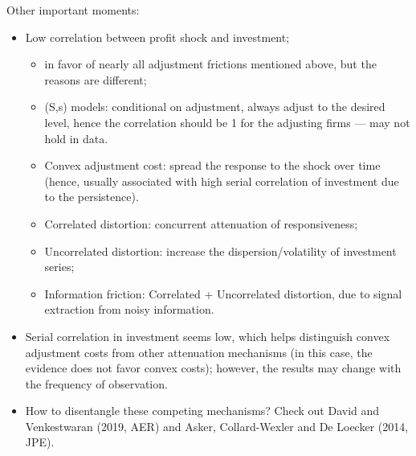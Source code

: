 \documentclass[12pt]{article}
\begin{document}
Other important moments:
\begin{itemize}
	\item Low correlation between profit shock and investment;
	\begin{itemize}
		\item in favor of nearly all adjustment frictions mentioned above, but the reasons are different;
		\item (S,s) models: conditional on adjustment, always adjust to the desired level, hence the correlation should be 1 for the adjusting firms --- may not hold in data.
		\item Convex adjustment cost: spread the response to the shock over time (hence, usually associated with high serial correlation of investment due to the persistence).
		\item Correlated distortion: concurrent attenuation of responsiveness;
		\item Uncorrelated distortion: increase the dispersion/volatility of investment series;
		\item Information friction: Correlated + Uncorrelated distortion, due to signal extraction from noisy information.
	\end{itemize}
		\item Serial correlation in investment seems low, which helps distinguish convex adjustment costs from other attenuation mechanisms (in this case, the evidence does not favor convex costs); however, the results may change with the frequency of observation.
	\item How to disentangle these competing mechanisms? Check out David and Venkestwaran (2019, AER) and Asker, Collard-Wexler and De Loecker (2014, JPE).  
\end{itemize}
\end{document}
